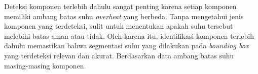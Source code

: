Deteksi komponen terlebih dahulu sangat penting karena setiap komponen memiliki ambang batas suhu \emph{overheat} yang berbeda. Tanpa mengetahui jenis komponen yang terdeteksi, sulit untuk menentukan apakah suhu tersebut melebihi batas aman atau tidak. Oleh karena itu, identifikasi komponen terlebih dahulu memastikan bahwa segmentasi suhu yang dilakukan pada \emph{bounding box} yang terdeteksi relevan dan akurat. Berdasarkan data ambang batas suhu masing-masing komponen.
